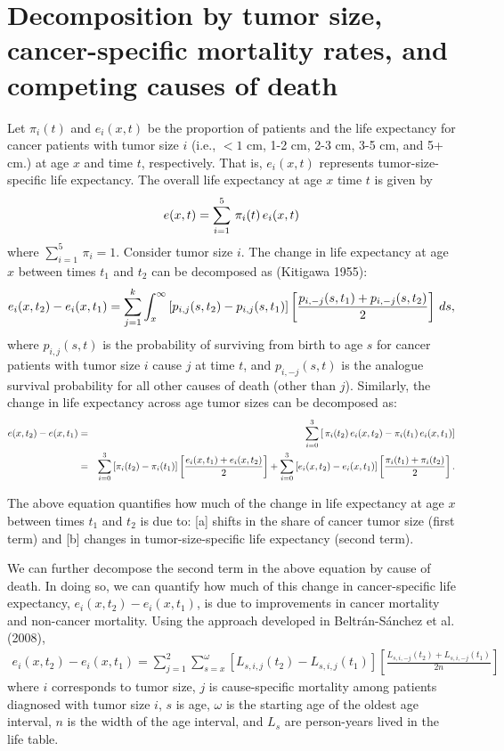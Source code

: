 \documentclass[twoside]{article}
\newcommand{\mysection}[1]{\addtocounter{section}{1}\section*{#1}}
\begin{document}
\mysection{Decomposition by tumor size, cancer-specific mortality rates, and competing causes of death}

Let $\pi_i(t)$ and $e_i(x,t)$ be the proportion of patients and the life expectancy for cancer patients with tumor size $i$ (i.e., $<1$ cm, 1-2 cm, 2-3 cm, 3-5 cm, and 5+ cm.) at age $x$ and time $t$, 
respectively. That is, 
$e_i(x,t)$ represents tumor-size-specific life expectancy. The overall life expectancy at age $x$ time $t$ is given by
\begin{eqnarray}
  e(x,t)=\sum_{i=1}^{5}\,\pi_i(t)\,e_i(x,t) \notag
\end{eqnarray}
where $\sum_{i=1}^{5}\,\pi_i=1$.  Consider tumor size $i$.  The change
in life expectancy at age $x$ between times $t_1$ and $t_2$ can be
decomposed as (Kitigawa 1955): 
\begin{equation}
 e_i(x,t_2)-e_i(x,t_1) = \sum_{j=1}^k \int_x^\infty \left[ p_{i,j}(s,t_2)- p_{i,j}(s,t_1)\right] \left[ \frac{p_{i,-j}(s,t_1)+p_{i,-j}(s,t_2)}{2} \right]\,ds, \notag
\end{equation}
where $p_{i,j}(s,t)$ is the probability of surviving from birth to age
$s$ for cancer patients with tumor size $i$ cause $j$ at time $t$, and
$p_{i,-j}(s,t)$ is the analogue survival probability for all other
causes of death (other than $j$).  Similarly, the change in life
expectancy across age tumor sizes can be decomposed as: 
\begin{eqnarray}
  e(x,t_2)-e(x,t_1)&=&\sum_{i=0}^{3}\left[\,\pi_i(t_2)\,e_i(x,t_2)- \pi_i(t_1)\,e_i(x,t_1)\right] \notag \\
  &=&\sum_{i=0}^{3}\left[\pi_i(t_2)-\pi_i(t_1) \right]\left[\frac{e_i(x,t_1)+e_i(x,t_2)}{2}\right]+\sum_{i=0}^{3}\left[e_i(x,t_2)-e_i(x,t_1) \right]\left[\frac{\pi_i(t_1)+\pi_i(t_2)}{2}\right]. \notag
\end{eqnarray}

The above equation quantifies how much of the change in life
expectancy at age $x$ between times $t_1$ and $t_2$ is due to: [a]
shifts in the share of cancer tumor size (first term) and [b] changes
in tumor-size-specific life expectancy (second term).


We can further decompose the second term in the above equation by
cause of death. In doing so, we can quantify how much of this change
in cancer-specific life expectancy, $e_i(x,t_2)-e_i(x,t_1)$, is due to
improvements in cancer mortality and non-cancer mortality.  Using the
approach developed in Beltr\'{a}n-S\'{a}nchez et al. (2008),
\begin{eqnarray}
e_i(x,t_2)-e_i(x,t_1)=\sum_{j=1}^{2} \sum_{s=x}^{\omega}\left[L_{s,i,j}(t_2)-L_{s,i,j}(t_1) \right] \left[\frac{L_{s,i,-j}(t_2)+L_{s,i,-j}(t_1) }{2n} \right]
\label{eqn:causedecomp}
\end{eqnarray}
where $i$ corresponds to tumor size, $j$ is cause-specific mortality
among patients diagnosed with tumor size $i$, $s$ is age, $\omega$ is
the starting age of the oldest age interval, $n$ is the width of the age
interval, and $L_s$ are person-years lived in the life table.
\end{document}

